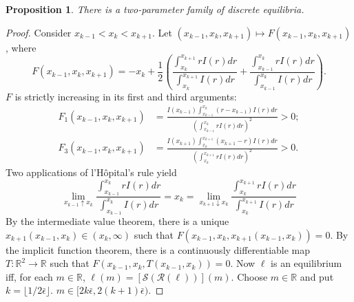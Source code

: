 \documentclass[12pt]{article}
\newtheorem{proposition}{Proposition}
\begin{document}
\begin{proposition}
There is a two-parameter family of discrete equilibria.
\end{proposition}
\begin{proof}
Consider $x_{k-1}<x_{k}<x_{k+1}$. Let $(x_{k-1},x_{k},x_{k+1})\mapsto F(x_{k-1},x_{k},x_{k+1})$, where
\begin{equation}
F(x_{k-1},x_{k},x_{k+1})=-x_{k}+\frac{1}{2}\left(\frac{\int_{x_{k}}^{x_{k+1}}{rI(r)dr}}{\int_{x_{k}}^{x_{k+1}}{I(r)dr}}+\frac{\int_{x_{k-1}}^{x_{k}}{rI(r)dr}}{\int_{x_{k-1}}^{x_{k}}{I(r)dr}}\right).
\end{equation}
$F$ is strictly increasing in its first and third arguments:
\begin{align}
F_{1}(x_{k-1},x_{k},x_{k+1})&=\frac{I(x_{k-1})\int_{x_{k-1}}^{x_{k}}{(r-x_{k-1})I(r)dr}}{\left(\int_{x_{k-1}}^{x_{k}}{rI(r)dr}\right)^{2}}>0;\\
F_{3}(x_{k-1},x_{k},x_{k+1})&=\frac{I(x_{k+1})\int_{x_{k}}^{x_{k+1}}{(x_{k+1}-r)I(r)dr}}{\left(\int_{x_{k}}^{x_{k+1}}{rI(r)dr}\right)^{2}}>0.
\end{align}
Two applications of l'H\^{o}pital's rule yield
\begin{equation}
\lim_{x_{k-1}\uparrow x_{k}}\frac{\int_{x_{k-1}}^{x_{k}}{rI(r)dr}}{\int_{x_{k-1}}^{x_{k}}{I(r)dr}}=x_{k}=\lim_{x_{k+1}\downarrow x_{k}}\frac{\int_{x_{k}}^{x_{k+1}}{rI(r)dr}}{\int_{x_{k}}^{x_{k+1}}{I(r)dr}}
\end{equation}
By the intermediate value theorem, there is a unique $x_{k+1}(x_{k-1},x_{k})\in(x_{k},\infty)$ such that $F(x_{k-1},x_{k},x_{k+1}(x_{k-1},x_{k}))=0$. By the implicit function theorem, there is a continuously differentiable map $T:\mathbb{R}^{2}\rightarrow\mathbb{R}$ such that $F(x_{k-1},x_{k},T(x_{k-1},x_{k}))=0$. Now $\ell$ is an equilibrium iff, for each $m\in\mathbb{R}$, $\ell(m)=[\mathcal{S}(\mathcal{R}(\ell))](m)$. Choose $m\in\mathbb{R}$ and put $k=\lfloor 1/2\bar{\epsilon}\rfloor$. $m\in[2k\bar{\epsilon},2(k+1)\bar{\epsilon})$.
\end{proof}
\end{document}

